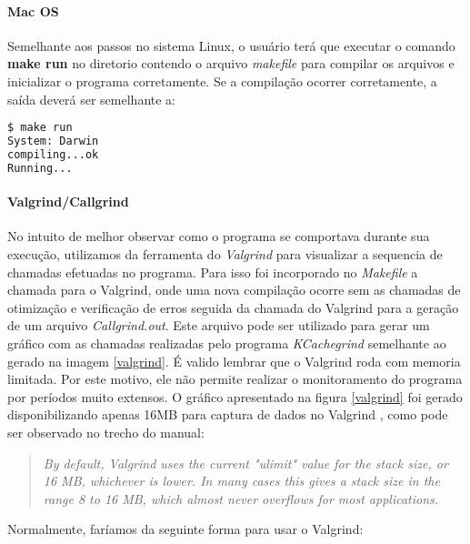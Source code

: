\paragraph{\textbf{Mac OS}}

Semelhante aos passos no sistema Linux, o usuário terá que executar o comando \textbf{make run} no diretorio contendo o arquivo \textit{makefile} para compilar os arquivos e inicializar o programa corretamente. Se a compilação ocorrer corretamente, a saída deverá ser semelhante a:

\begin{lstlisting}[language=bash,title=\textit{Saída do terminal - Mac OS},numbers=none]
$ make run
System: Darwin
compiling...ok
Running...
\end{lstlisting}


\paragraph{\textbf{Valgrind/Callgrind}}

No intuito de melhor observar como o programa se comportava durante sua execução, utilizamos da ferramenta do \textit{Valgrind} para visualizar a sequencia de chamadas efetuadas no programa.
Para isso foi incorporado no \textit{Makefile} a chamada para o Valgrind, onde uma nova compilação ocorre sem as chamadas de otimização e verificação de erros seguida da chamada do Valgrind para a geração de um arquivo \textit{Callgrind.out}. Este arquivo pode ser utilizado para gerar um gráfico com as chamadas realizadas pelo programa \textit{KCachegrind} semelhante ao gerado na imagem \ref{valgrind}. É valido lembrar que o Valgrind roda com memoria limitada. Por este motivo, ele não permite realizar o monitoramento do programa por períodos muito extensos. O gráfico apresentado na figura \ref{valgrind} foi gerado disponibilizando apenas 16MB para captura de dados no Valgrind \cite{valgrind}, como pode ser observado no trecho do manual:

\begin{quote}
	\textit{By default, Valgrind uses the current "ulimit" value for the stack size, or 16 MB, whichever is lower. In many cases this gives a stack size in the
           range 8 to 16 MB, which almost never overflows for most applications.}\cite{valgrind}
\end{quote}

Normalmente, faríamos da seguinte forma para usar o Valgrind:

